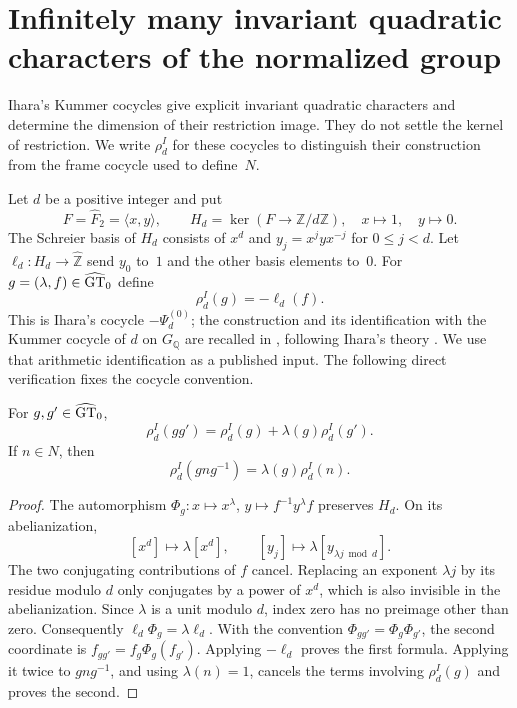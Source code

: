 \section{Infinitely many invariant quadratic characters of the normalized group}
\label{sec:quadratic-dimension}

Ihara's Kummer cocycles give explicit invariant quadratic characters and
determine the dimension of their restriction image. They do not settle
the kernel of restriction. We write
$\rho_d^I$ for these cocycles to distinguish their construction from the
frame cocycle used to define~$N$.

Let $d$ be a positive integer and put
\[
 F=\widehat F_2=\langle x,y\rangle,\qquad
 H_d=\ker(F\longrightarrow\mathbb Z/d\mathbb Z),
 \quad x\longmapsto1,\quad y\longmapsto0.
\]
The Schreier basis of $H_d$ consists of $x^d$ and
$y_j=x^jyx^{-j}$ for $0\leq j<d$. Let
$\ell_d:H_d\to\widehat{\mathbb Z}$ send $y_0$ to~$1$ and the other
basis elements to~$0$. For $g=(\lambda,f)\in\widehat{\mathrm{GT}}_0$ define
\[
 \rho_d^I(g)=-\ell_d(f).
\]
This is Ihara's cocycle $-\Psi_d^{(0)}$; the construction and its
identification with the Kummer cocycle of $d$ on $G_{\mathbb Q}$ are
recalled in \cite[\S2.2]{Furusho2003}, following Ihara's theory
\cite{Ihara1999}. We use that arithmetic identification as a published
input. The following direct verification fixes the cocycle convention.

\begin{lemma}\label{lem:ihara-cocycle}
For $g,g'\in\widehat{\mathrm{GT}}_0$,
\[
 \rho_d^I(gg')=\rho_d^I(g)+\lambda(g)\rho_d^I(g').
\]
If $n\in N$, then
\[
 \rho_d^I(gng^{-1})=\lambda(g)\rho_d^I(n).
\]
\end{lemma}

\begin{proof}
The automorphism $\Phi_g:x\mapsto x^\lambda$,
$y\mapsto f^{-1}y^\lambda f$ preserves $H_d$. On its abelianization,
\[
 [x^d]\longmapsto\lambda[x^d],\qquad
 [y_j]\longmapsto\lambda[y_{\lambda j\bmod d}].
\]
The two conjugating contributions of $f$ cancel. Replacing an exponent
$\lambda j$ by its residue modulo $d$ only conjugates by a power of
$x^d$, which is also invisible in the abelianization. Since $\lambda$
is a unit modulo $d$, index zero has no preimage other than zero.
Consequently $\ell_d\Phi_g=\lambda\ell_d$.
With the convention $\Phi_{gg'}=\Phi_g\Phi_{g'}$, the second coordinate
is $f_{gg'}=f_g\Phi_g(f_{g'})$. Applying $-\ell_d$ proves the first
formula. Applying it twice to $gng^{-1}$, and using $\lambda(n)=1$,
cancels the terms involving $\rho_d^I(g)$ and proves the second.
\end{proof}

